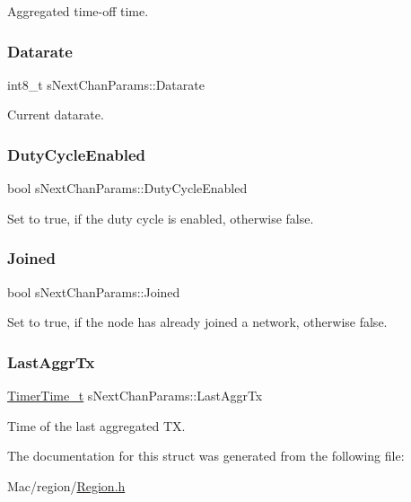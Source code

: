 Aggregated time-\/off time. \mbox{\label{structsNextChanParams_aecc50a3a952bd990553b873dc6858393}} 
\subsubsection{\texorpdfstring{Datarate}{Datarate}}
{\footnotesize\ttfamily int8\+\_\+t s\+Next\+Chan\+Params\+::\+Datarate}

Current datarate. \mbox{\label{structsNextChanParams_a3afdcbe5a3dba77f73c7534957b82ce5}} 
\subsubsection{\texorpdfstring{Duty\+Cycle\+Enabled}{DutyCycleEnabled}}
{\footnotesize\ttfamily bool s\+Next\+Chan\+Params\+::\+Duty\+Cycle\+Enabled}

Set to true, if the duty cycle is enabled, otherwise false. \mbox{\label{structsNextChanParams_a147c9e2910dd7f22b8378e80d9b383ef}} 
\subsubsection{\texorpdfstring{Joined}{Joined}}
{\footnotesize\ttfamily bool s\+Next\+Chan\+Params\+::\+Joined}

Set to true, if the node has already joined a network, otherwise false. \mbox{\label{structsNextChanParams_a4f5d9417759fa1ef8b3103ef04d54829}} 
\subsubsection{\texorpdfstring{Last\+Aggr\+Tx}{LastAggrTx}}
{\footnotesize\ttfamily \hyperlink{utilities_8h_a4215ca43d3e953099ea758ce428599d0}{Timer\+Time\+\_\+t} s\+Next\+Chan\+Params\+::\+Last\+Aggr\+Tx}

Time of the last aggregated TX. 

The documentation for this struct was generated from the following file\+:\begin{DoxyCompactItemize}
\item 
Mac/region/\hyperlink{Region_8h}{Region.\+h}\end{DoxyCompactItemize}
